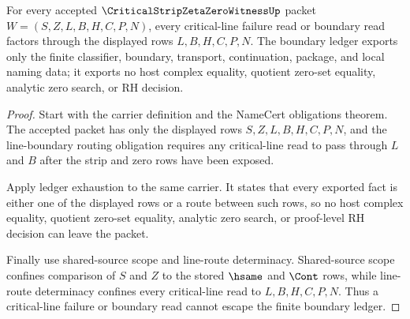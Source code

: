 \begin{theorem}
\label{thm:critical-strip-zeta-zero-boundary-ledger-nonescape}
For every accepted $\CriticalStripZetaZeroWitnessUp$ packet $W=(S,Z,L,B,H,C,P,N)$, every critical-line failure read or boundary read factors through the displayed rows $L,B,H,C,P,N$. The boundary ledger exports only the finite classifier, boundary, transport, continuation, package, and local naming data; it exports no host complex equality, quotient zero-set equality, analytic zero search, or RH decision.
\end{theorem}
\begin{proof}
Start with the carrier definition and the NameCert obligations theorem. The accepted packet has only the displayed rows $S,Z,L,B,H,C,P,N$, and the line-boundary routing obligation requires any critical-line read to pass through $L$ and $B$ after the strip and zero rows have been exposed.

Apply ledger exhaustion to the same carrier. It states that every exported fact is either one of the displayed rows or a route between such rows, so no host complex equality, quotient zero-set equality, analytic zero search, or proof-level RH decision can leave the packet.

Finally use shared-source scope and line-route determinacy. Shared-source scope confines comparison of $S$ and $Z$ to the stored $\hsame$ and $\Cont$ rows, while line-route determinacy confines every critical-line read to $L,B,H,C,P,N$. Thus a critical-line failure or boundary read cannot escape the finite boundary ledger.
\end{proof}

